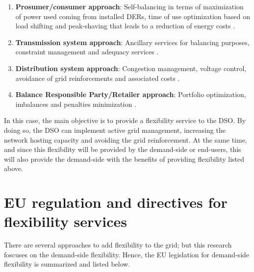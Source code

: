 \begin{enumerate}
\item \textbf{Prosumer/consumer approach}: Self-balancing in terms of maximization of power used coming from installed DERs, time of use optimization based on load shifting and peak-shaving that leads to a reduction of energy costs \cite{Olivella-Rosell2018}.
\item \textbf{Transmission system approach}: Ancillary services for balancing purposes, constraint management and adequacy services \cite{USEF2018}.
\item \textbf{Distribution system approach}: Congestion management, voltage control, avoidance of grid reinforcements and associated costs \cite{USEF2018, Olivella-Rosell2018}.
\item \textbf{Balance Responsible Party/Retailer approach}: Portfolio optimization, imbalances and penalties minimization \cite{Olivella-Rosell2018}.
\end{enumerate}

In this case, the main objective is to provide a flexibility service to the DSO. By doing so, the DSO can implement active grid management, increasing the network hosting capacity and avoiding the grid reinforcement. At the same time, and since this flexibility will be provided by the demand-side or end-users, this will also provide the demand-side with the benefits of providing flexibility listed above. 

\section{EU regulation and directives for flexibility services}
There are several approaches to add flexibility to the grid; but this research foscuses on the demand-side flexibility. Hence, the EU legislation for demand-side flexibility is summarized and listed below. 

